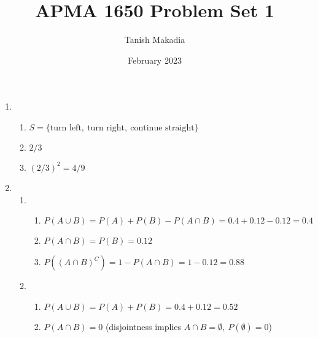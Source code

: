 \documentclass[12pt,reqno]{article}
\title{APMA 1650 Problem Set 1}
\author{Tanish Makadia}
\date{February 2023}
\theoremstyle{plain}
\theoremstyle{definition}
\begin{document}
\maketitle


\begin{enumerate}
    \item \begin{enumerate}
            \item \(S = \{\text{turn left},\ \text{turn right},\ \text{continue straight}\}\)
            \item \(2/3\)
            \item \((2/3)^2=4/9\) \bigskip
    \end{enumerate}
    \item \begin{enumerate}
        \item \begin{enumerate}
            \item \(P(A\cup B) = P(A) + P(B) - P(A\cap B)=0.4+0.12-0.12=0.4\)
            \item \(P(A\cap B) = P(B) = 0.12\)
            \item \(P((A\cap B)^C)=1-P(A\cap B)=1-0.12=0.88\)
        \end{enumerate}
        \item \begin{enumerate}
            \item \(P(A\cup B) = P(A) + P(B) =0.4+0.12=0.52\)
            \item \(P(A\cap B) = 0\) (disjointness implies \(A\cap B=\emptyset,\ P(\emptyset)=0\))
        \end{enumerate}
    \end{enumerate}
\end{enumerate}





\end{document}
